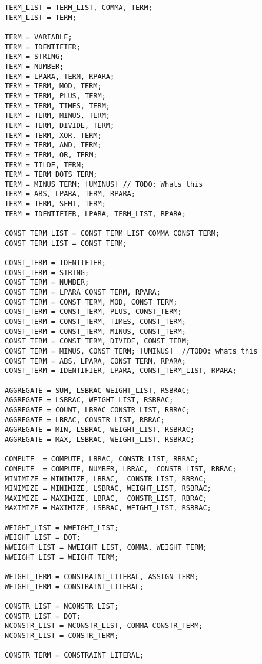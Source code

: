 \begin{verbatim}
TERM_LIST = TERM_LIST, COMMA, TERM;
TERM_LIST = TERM;

TERM = VARIABLE;
TERM = IDENTIFIER;
TERM = STRING;
TERM = NUMBER;
TERM = LPARA, TERM, RPARA;
TERM = TERM, MOD, TERM;
TERM = TERM, PLUS, TERM;
TERM = TERM, TIMES, TERM;
TERM = TERM, MINUS, TERM;
TERM = TERM, DIVIDE, TERM;
TERM = TERM, XOR, TERM;
TERM = TERM, AND, TERM;
TERM = TERM, OR, TERM;
TERM = TILDE, TERM;
TERM = TERM DOTS TERM;
TERM = MINUS TERM; [UMINUS] // TODO: Whats this
TERM = ABS, LPARA, TERM, RPARA;
TERM = TERM, SEMI, TERM;
TERM = IDENTIFIER, LPARA, TERM_LIST, RPARA;

CONST_TERM_LIST = CONST_TERM_LIST COMMA CONST_TERM;
CONST_TERM_LIST = CONST_TERM;

CONST_TERM = IDENTIFIER;
CONST_TERM = STRING;
CONST_TERM = NUMBER;
CONST_TERM = LPARA CONST_TERM, RPARA;
CONST_TERM = CONST_TERM, MOD, CONST_TERM;
CONST_TERM = CONST_TERM, PLUS, CONST_TERM;
CONST_TERM = CONST_TERM, TIMES, CONST_TERM;
CONST_TERM = CONST_TERM, MINUS, CONST_TERM;
CONST_TERM = CONST_TERM, DIVIDE, CONST_TERM;
CONST_TERM = MINUS, CONST_TERM; [UMINUS]  //TODO: whats this
CONST_TERM = ABS, LPARA, CONST_TERM, RPARA;
CONST_TERM = IDENTIFIER, LPARA, CONST_TERM_LIST, RPARA;

AGGREGATE = SUM, LSBRAC WEIGHT_LIST, RSBRAC;
AGGREGATE = LSBRAC, WEIGHT_LIST, RSBRAC;
AGGREGATE = COUNT, LBRAC CONSTR_LIST, RBRAC;
AGGREGATE = LBRAC, CONSTR_LIST, RBRAC;
AGGREGATE = MIN, LSBRAC, WEIGHT_LIST, RSBRAC;
AGGREGATE = MAX, LSBRAC, WEIGHT_LIST, RSBRAC;

COMPUTE  = COMPUTE, LBRAC, CONSTR_LIST, RBRAC;
COMPUTE  = COMPUTE, NUMBER, LBRAC,  CONSTR_LIST, RBRAC;
MINIMIZE = MINIMIZE, LBRAC,  CONSTR_LIST, RBRAC;
MINIMIZE = MINIMIZE, LSBRAC, WEIGHT_LIST, RSBRAC;
MAXIMIZE = MAXIMIZE, LBRAC,  CONSTR_LIST, RBRAC;
MAXIMIZE = MAXIMIZE, LSBRAC, WEIGHT_LIST, RSBRAC;

WEIGHT_LIST = NWEIGHT_LIST;
WEIGHT_LIST = DOT;
NWEIGHT_LIST = NWEIGHT_LIST, COMMA, WEIGHT_TERM;
NWEIGHT_LIST = WEIGHT_TERM;

WEIGHT_TERM = CONSTRAINT_LITERAL, ASSIGN TERM;
WEIGHT_TERM = CONSTRAINT_LITERAL;

CONSTR_LIST = NCONSTR_LIST;
CONSTR_LIST = DOT;
NCONSTR_LIST = NCONSTR_LIST, COMMA CONSTR_TERM;
NCONSTR_LIST = CONSTR_TERM;

CONSTR_TERM = CONSTRAINT_LITERAL;
\end{verbatim}